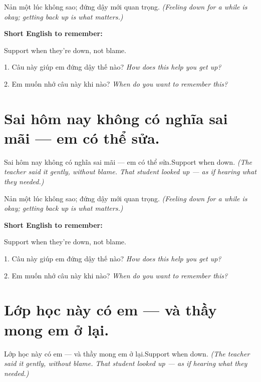 \begin{baihoc}
Nản một lúc không sao; đứng dậy mới quan trọng.
\textit{(Feeling down for a while is okay; getting back up is what matters.)}
\end{baihoc}

\begin{ghinhoanh}
\textbf{Short English to remember:}

Support when they're down, not blame.

\end{ghinhoanh}

\begin{tuhocnhanh}
1. Câu này giúp em đứng dậy thế nào? \textit{How does this help you get up?}

2. Em muốn nhớ câu này khi nào? \textit{When do you want to remember this?}
\end{tuhocnhanh}
\ngancach


\section{Sai hôm nay không có nghĩa sai mãi — em có thể sửa.}
\begin{truyen}{Sai hôm nay không có nghĩa sai mãi — em có thể sửa.}{Support when down.}
\textit{(The teacher said it gently, without blame. That student looked up — as if hearing what they needed.)}
\end{truyen}

\begin{baihoc}
Nản một lúc không sao; đứng dậy mới quan trọng.
\textit{(Feeling down for a while is okay; getting back up is what matters.)}
\end{baihoc}

\begin{ghinhoanh}
\textbf{Short English to remember:}

Support when they're down, not blame.

\end{ghinhoanh}

\begin{tuhocnhanh}
1. Câu này giúp em đứng dậy thế nào? \textit{How does this help you get up?}

2. Em muốn nhớ câu này khi nào? \textit{When do you want to remember this?}
\end{tuhocnhanh}
\ngancach


\section{Lớp học này có em — và thầy mong em ở lại.}
\begin{truyen}{Lớp học này có em — và thầy mong em ở lại.}{Support when down.}
\textit{(The teacher said it gently, without blame. That student looked up — as if hearing what they needed.)}
\end{truyen}

